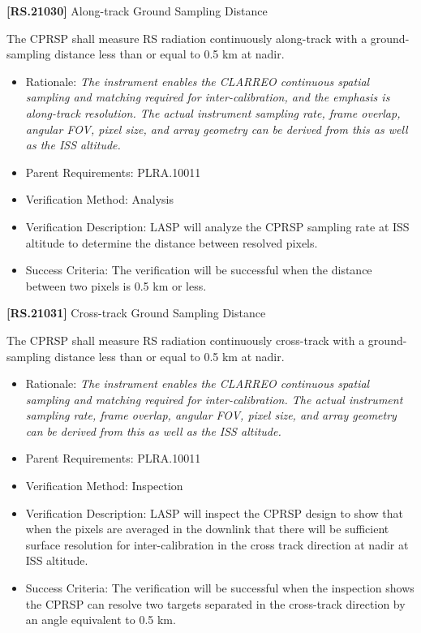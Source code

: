 \textbf{[RS.21030]} Along-track Ground Sampling Distance

The \gls{CPRSP} shall \gls{measure} \gls{RS} radiation continuously along-track with a ground-sampling distance less than or equal to 0.5 km at nadir.

\begin{itemize}
\item{} Rationale: \emph{The instrument enables the CLARREO continuous spatial sampling and matching required for inter-calibration, and the emphasis is along-track resolution. The actual instrument sampling rate, frame overlap, angular FOV, pixel size, and array geometry can be derived from this as well as the ISS altitude.}

\item{} Parent Requirements: PLRA.10011

\item{} Verification Method: Analysis

\item{} Verification Description: \gls{LASP} will analyze the \gls{CPRSP} sampling rate at \gls{ISS} altitude to determine the distance between resolved pixels.

\item{} Success Criteria: The verification will be successful when the distance between two pixels is 0.5 km or less.

\end{itemize}

\textbf{[RS.21031]} Cross-track Ground Sampling Distance

The \gls{CPRSP} shall \gls{measure} \gls{RS} radiation continuously cross-track with a ground-sampling distance less than or equal to 0.5 km at nadir.

\begin{itemize}
\item{} Rationale: \emph{The instrument enables the CLARREO continuous spatial sampling and matching required for inter-calibration. The actual instrument sampling rate, frame overlap, angular FOV, pixel size, and array geometry can be derived from this as well as the ISS altitude.}

\item{} Parent Requirements: PLRA.10011

\item{} Verification Method: Inspection

\item{} Verification Description: \gls{LASP} will inspect the \gls{CPRSP} design to show that when the pixels are averaged in the downlink that there will be sufficient surface resolution for inter-calibration in the cross track direction at nadir at \gls{ISS} altitude.

\item{} Success Criteria: The verification will be successful when the \gls{inspection} shows the \gls{CPRSP} can resolve two targets separated in the cross-track direction by an angle equivalent to 0.5 km.

\end{itemize}

